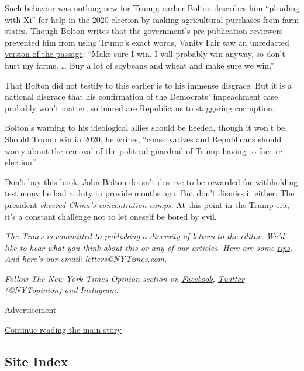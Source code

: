 Such behavior was nothing new for Trump; earlier Bolton describes him
``pleading with Xi'' for help in the 2020 election by making
agricultural purchases from farm states. Though Bolton writes that the
government's pre-publication reviewers prevented him from using Trump's
exact words, Vanity Fair saw an unredacted
\href{https://www.vanityfair.com/news/2020/06/boltons-unredacted-book-shows-trump-trying-to-hide}{version
of the passage}: ``Make sure I win. I will probably win anyway, so don't
hurt my farms. \ldots{} Buy a lot of soybeans and wheat and make sure we
win.''

That Bolton did not testify to this earlier is to his immense disgrace.
But it is a national disgrace that his confirmation of the Democrats'
impeachment case probably won't matter, so inured are Republicans to
staggering corruption.

Bolton's warning to his ideological allies should be heeded, though it
won't be. Should Trump win in 2020, he writes, ``conservatives and
Republicans should worry about the removal of the political guardrail of
Trump having to face re-election.''

Don't buy this book. John Bolton doesn't deserve to be rewarded for
withholding testimony he had a duty to provide months ago. But don't
dismiss it either. The president \emph{cheered China's concentration
camps}. At this point in the Trump era, it's a constant challenge not to
let oneself be bored by evil.

\emph{The Times is committed to publishing}
\href{https://www.nytimes3xbfgragh.onion/2019/01/31/opinion/letters/letters-to-editor-new-york-times-women.html}{\emph{a
diversity of letters}} \emph{to the editor. We'd like to hear what you
think about this or any of our articles. Here are some}
\href{https://help.nytimes3xbfgragh.onion/hc/en-us/articles/115014925288-How-to-submit-a-letter-to-the-editor}{\emph{tips}}\emph{.
And here's our email:}
\href{mailto:letters@NYTimes.com}{\emph{letters@NYTimes.com}}\emph{.}

\emph{Follow The New York Times Opinion section on}
\href{https://www.facebookcorewwwi.onion/nytopinion}{\emph{Facebook}}\emph{,}
\href{http://twitter.com/NYTOpinion}{\emph{Twitter (@NYTopinion)}}
\emph{and}
\href{https://www.instagram.com/nytopinion/}{\emph{Instagram}}\emph{.}

Advertisement

\protect\hyperlink{after-bottom}{Continue reading the main story}

\hypertarget{site-index}{%
\subsection{Site Index}\label{site-index}}

